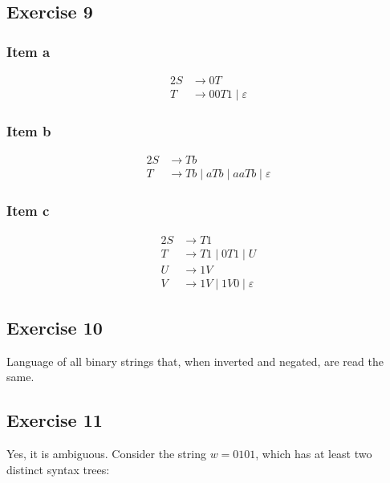\documentclass[docid=TP08]{tcom_TP}
\begin{document}
{\subsection{Exercise 9}
\subsubsection{Item a}
\begin{alignat*}{2}
	S &\rightarrow 0T \\
	T &\rightarrow 00T1\mid \varepsilon
\end{alignat*}
\subsubsection{Item b}
\begin{alignat*}{2}
	S &\rightarrow Tb \\
	T &\rightarrow Tb\mid aTb\mid aaTb\mid \varepsilon
\end{alignat*}
\subsubsection{Item c}
\begin{alignat*}{2}
	S &\rightarrow T1 \\
	T &\rightarrow T1\mid 0T1\mid U \\
	U &\rightarrow 1V \\
	V &\rightarrow 1V\mid 1V0\mid \varepsilon
\end{alignat*}
\subsection{Exercise 10}
Language of all binary strings that, when inverted and negated, are read the same.
\subsection{Exercise 11}
Yes, it is ambiguous. Consider the string $w=0101$, which has at least two distinct syntax trees:\\
\begin{minipage}[t]{0.49\textwidth}
\begin{center}
\end{center}
\end{minipage}%
\begin{minipage}[t]{0.49\textwidth}
\begin{center}
\end{center}
\end{minipage}
}
\end{document}
